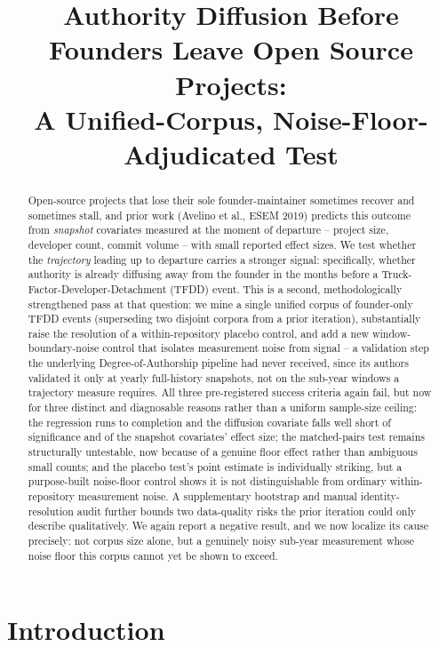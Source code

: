 \documentclass[11pt,letterpaper]{article}
\title{Authority Diffusion Before Founders Leave Open Source Projects: \\ A Unified-Corpus, Noise-Floor-Adjudicated Test}
\author{}
\date{}
\begin{document}
\maketitle

\begin{abstract}
Open-source projects that lose their sole founder-maintainer sometimes recover and sometimes stall, and prior work (Avelino et al., ESEM 2019) predicts this outcome from \emph{snapshot} covariates measured at the moment of departure -- project size, developer count, commit volume -- with small reported effect sizes. We test whether the \emph{trajectory} leading up to departure carries a stronger signal: specifically, whether authority is already diffusing away from the founder in the months before a Truck-Factor-Developer-Detachment (TFDD) event. This is a second, methodologically strengthened pass at that question: we mine a single unified corpus of founder-only TFDD events (superseding two disjoint corpora from a prior iteration), substantially raise the resolution of a within-repository placebo control, and add a new window-boundary-noise control that isolates measurement noise from signal -- a validation step the underlying Degree-of-Authorship pipeline had never received, since its authors validated it only at yearly full-history snapshots, not on the sub-year windows a trajectory measure requires. All three pre-registered success criteria again fail, but now for three distinct and diagnosable reasons rather than a uniform sample-size ceiling: the regression runs to completion and the diffusion covariate falls well short of significance and of the snapshot covariates' effect size; the matched-pairs test remains structurally untestable, now because of a genuine floor effect rather than ambiguous small counts; and the placebo test's point estimate is individually striking, but a purpose-built noise-floor control shows it is not distinguishable from ordinary within-repository measurement noise. A supplementary bootstrap and manual identity-resolution audit further bounds two data-quality risks the prior iteration could only describe qualitatively. We again report a negative result, and we now localize its cause precisely: not corpus size alone, but a genuinely noisy sub-year measurement whose noise floor this corpus cannot yet be shown to exceed.
\end{abstract}

\section{Introduction}
\end{document}
